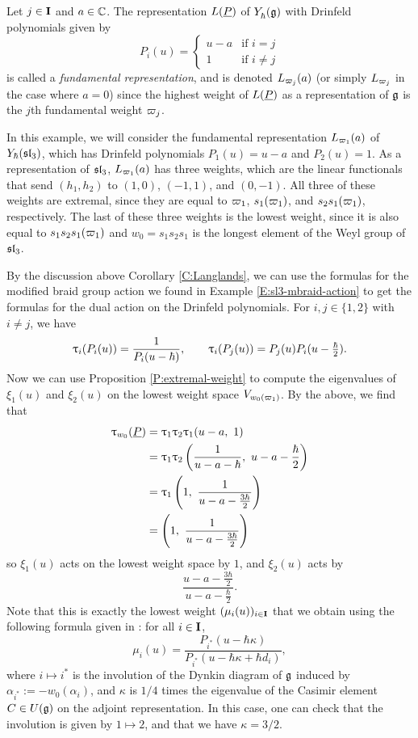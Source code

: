 \begin{example}\label{E:dual-braid-sl3}
    Let $j\in\mathbf{I}$ and $a\in\mathbb{C}$.
    The representation $L(\underline{P})$ of $Y_\hbar^{}(\mathfrak{g})$ with Drinfeld polynomials given by
    \[P_i(u) =
    \begin{cases}
        u-a & \text{if } i=j \\
        1 & \text{if } i\neq j
    \end{cases}\]
    is called a \emph{fundamental representation}, and is denoted $L_{\varpi_j}(a)$ (or simply $L_{\varpi_j}$ in the case where $a=0$) since the highest weight of $L(\underline{P})$ as a representation of $\mathfrak{g}$ is the $j$th fundamental weight $\varpi_j$.

    In this example, we will consider the fundamental representation $L_{\varpi_1}(a)$ of $Y_\hbar(\mathfrak{sl}_3)$, which has Drinfeld polynomials $P_1(u) = u-a$ and $P_2(u) = 1$.
    As a representation of $\mathfrak{sl}_3$, $L_{\varpi_1}(a)$ has three weights, which are the linear functionals that send $(h_1,h_2)$ to $(1,0)$, $(-1,1)$, and $(0,-1)$.
    All three of these weights are extremal, since they are equal to $\varpi_1$, $s_1(\varpi_1)$, and $s_2s_1(\varpi_1)$, respectively.
    The last of these three weights is the lowest weight, since it is also equal to $s_1s_2s_1(\varpi_1)$ and $w_0 = s_1s_2s_1$ is the longest element of the Weyl group of $\mathfrak{sl}_3$.

    By the discussion above Corollary \ref{C:Langlands}, we can use the formulas for the modified braid group action we found in Example \ref{E:sl3-mbraid-action} to get the formulas for the dual action on the Drinfeld polynomials.
    For $i,j\in\{1,2\}$ with $i\neq j$, we have
    \[\uptau_i(P_i(u)) = \frac{1}{P_i(u-\hbar)}, \qquad \uptau_i(P_j(u)) = P_j(u)P_i(u-\tfrac{\hbar}{2}).\]
    Now we can use Proposition \ref{P:extremal-weight} to compute the eigenvalues of $\xi_1(u)$ and $\xi_2(u)$ on the lowest weight space $V_{w_0(\varpi_1)}$.
    By the above, we find that
    \begin{align*}
        \braid_{w_0}(\uP) & = \braid_1\braid_2\braid_1(u-a,\ 1) \\
        &= \braid_1\braid_2\left(\frac{1}{u-a-\hbar},\ u-a-\frac{\hbar}{2}\right) \\
        &= \braid_1\left(1,\ \frac{1}{u-a-\frac{3\hbar}{2}}\right) \\
        &= \left(1,\ \frac{1}{u-a-\frac{3\hbar}{2}}\right)
    \end{align*}
    so $\xi_1(u)$ acts on the lowest weight space by $1$, and $\xi_2(u)$ acts by
    \[\frac{u-a-\frac{3\hbar}{2}}{u-a-\frac{\hbar}{2}}.\]
    Note that this is exactly the lowest weight $(\mu_i(u))_{i\in\mathbf{I}}$ that we obtain using the following formula given in \cite[Prop. 3.5]{gautam_poles_2023}: for all $i\in\mathbf{I}$,
    \[\mu_i(u) = \frac{P_{i^*}(u-\hbar\kappa)}{P_{i^*}(u-\hbar\kappa+\hbar d_i)},\]
    where $i\mapsto i^*$ is the involution of the Dynkin diagram of $\mathfrak{g}$ induced by $\alpha_{i^*} := -w_0(\alpha_i)$, and $\kappa$ is $1/4$ times the eigenvalue of the Casimir element $C\in U(\mathfrak{g})$ on the adjoint representation.
    In this case, one can check that the involution is given by $1\mapsto 2$, and that we have $\kappa = 3/2$.
\end{example}
